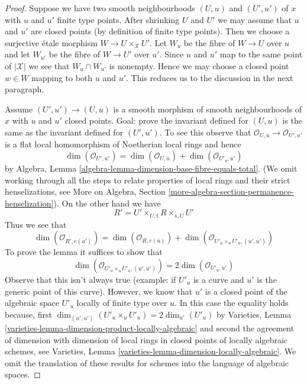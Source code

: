 \begin{proof}
Suppose we have two smooth neighbourhoods $(U, u)$ and $(U', u')$
of $x$ with $u$ and $u'$ finite type points. After shrinking $U$
and $U'$ we may assume that $u$ and $u'$ are closed points
(by definition of finite type points). Then we choose
a surjective \'etale morphism $W \to U \times_\mathcal{X} U'$.
Let $W_u$ be the fibre of $W \to U$ over $u$ and
let $W_{u'}$ be the fibre of $W \to U'$ over $u'$.
Since $u$ and $u'$ map to the same point of $|\mathcal{X}|$
we see that $W_u \cap W_{u'}$ is nonempty.
Hence we may choose a closed point $w \in W$ mapping to
both $u$ and $u'$. This reduces us to the discussion in the
next paragraph.

\medskip\noindent
Assume $(U', u') \to (U, u)$ is a smooth morphism of smooth
neighbourhoods of $x$ with $u$ and $u'$ closed points.
Goal: prove the invariant defined for $(U, u)$ is the same
as the invariant defined for $(U', u')$.
To see this observe that $\mathcal{O}_{U, u} \to \mathcal{O}_{U', u'}$
is a flat local homomorphism of Noetherian local rings and hence
$$
\dim(\mathcal{O}_{U', \overline{u}'}) =
\dim(\mathcal{O}_{U, \overline{u}}) +
\dim(\mathcal{O}_{U'_u, \overline{u}'})
$$
by Algebra, Lemma \ref{algebra-lemma-dimension-base-fibre-equals-total}.
(We omit working through all the steps to relate properties of local
rings and their strict henselizations, see
More on Algebra, Section \ref{more-algebra-section-permanence-henselization}).
On the other hand we have
$$
R' = U' \times_{U, t} R \times_{s, U} U'
$$
Thus we see that
$$
\dim(\mathcal{O}_{R', e(\overline{u}')}) =
\dim(\mathcal{O}_{R, e(\overline{u})}) +
\dim(\mathcal{O}_{U'_u \times_u U'_u, (\overline{u}', \overline{u}')})
$$
To prove the lemma it suffices to show that
$$
\dim(\mathcal{O}_{U'_u \times_u U'_u, (\overline{u}', \overline{u}')}) =
2\dim(\mathcal{O}_{U'_u, \overline{u}'})
$$
Observe that this isn't always true (example: if $U'_u$ is a curve
and $u'$ is the generic point of this curve). However, we know
that $u'$ is a closed point of the algebraic space $U'_u$ locally
of finite type over $u$. In this case the equality holds because, first
$\dim_{(u', u')}(U'_u \times_u U'_u) = 2\dim_{u'}(U'_u)$ by
Varieties, Lemma \ref{varieties-lemma-dimension-product-locally-algebraic}
and second the agreement of dimension with dimension of local rings
in closed points of locally algebraic schemes, see
Varieties, Lemma \ref{varieties-lemma-dimension-locally-algebraic}.
We omit the translation of these results for schemes into the
language of algebraic spaces.
\end{proof}

